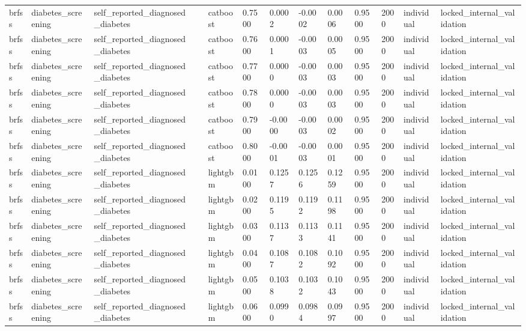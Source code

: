 \begin{tabular}{lllllllllllll}
brfss & diabetes\_screening & self\_reported\_diagnosed\_diabetes &  & catboost & 0.7500 & 0.0002 & -0.0002 & 0.0006 & 0.9500 & 2000 & individual & locked\_internal\_validation \\
brfss & diabetes\_screening & self\_reported\_diagnosed\_diabetes &  & catboost & 0.7600 & 0.0001 & -0.0003 & 0.0005 & 0.9500 & 2000 & individual & locked\_internal\_validation \\
brfss & diabetes\_screening & self\_reported\_diagnosed\_diabetes &  & catboost & 0.7700 & 0.0000 & -0.0003 & 0.0003 & 0.9500 & 2000 & individual & locked\_internal\_validation \\
brfss & diabetes\_screening & self\_reported\_diagnosed\_diabetes &  & catboost & 0.7800 & 0.0000 & -0.0003 & 0.0003 & 0.9500 & 2000 & individual & locked\_internal\_validation \\
brfss & diabetes\_screening & self\_reported\_diagnosed\_diabetes &  & catboost & 0.7900 & -0.0000 & -0.0003 & 0.0002 & 0.9500 & 2000 & individual & locked\_internal\_validation \\
brfss & diabetes\_screening & self\_reported\_diagnosed\_diabetes &  & catboost & 0.8000 & -0.0001 & -0.0003 & 0.0001 & 0.9500 & 2000 & individual & locked\_internal\_validation \\
brfss & diabetes\_screening & self\_reported\_diagnosed\_diabetes &  & lightgbm & 0.0100 & 0.1257 & 0.1256 & 0.1259 & 0.9500 & 2000 & individual & locked\_internal\_validation \\
brfss & diabetes\_screening & self\_reported\_diagnosed\_diabetes &  & lightgbm & 0.0200 & 0.1195 & 0.1192 & 0.1198 & 0.9500 & 2000 & individual & locked\_internal\_validation \\
brfss & diabetes\_screening & self\_reported\_diagnosed\_diabetes &  & lightgbm & 0.0300 & 0.1137 & 0.1133 & 0.1141 & 0.9500 & 2000 & individual & locked\_internal\_validation \\
brfss & diabetes\_screening & self\_reported\_diagnosed\_diabetes &  & lightgbm & 0.0400 & 0.1087 & 0.1082 & 0.1092 & 0.9500 & 2000 & individual & locked\_internal\_validation \\
brfss & diabetes\_screening & self\_reported\_diagnosed\_diabetes &  & lightgbm & 0.0500 & 0.1038 & 0.1032 & 0.1043 & 0.9500 & 2000 & individual & locked\_internal\_validation \\
brfss & diabetes\_screening & self\_reported\_diagnosed\_diabetes &  & lightgbm & 0.0600 & 0.0990 & 0.0984 & 0.0997 & 0.9500 & 2000 & individual & locked\_internal\_validation \\

\end{tabular}

